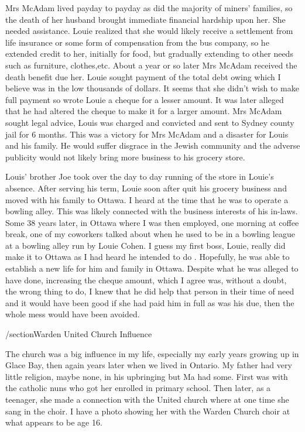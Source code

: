 Mrs McAdam lived payday to payday as did the majority of miners' families, so the death of her husband brought immediate financial hardship upon her. She needed assistance. Louie realized that she would likely receive a settlement from life insurance or some form of compensation from the bus company, so he extended credit to her, initially for food, but gradually extending to other needs such as furniture, clothes,etc. About a year or so later Mrs McAdam received the death benefit due her. Louie sought payment of the total debt owing which I believe was in the low thousands of dollars. It seems that she didn't wish to make full payment so wrote Louie a cheque for a lesser amount. It was later alleged that he had altered the cheque to make it for a larger amount. Mrs McAdam sought legal advice, Louis was charged and convicted and sent to Sydney county jail for 6 months. This was a victory for Mrs McAdam and a disaster for Louis and his family. He would suffer disgrace in the Jewish community and the adverse publicity would not likely bring more business to his grocery store.

Louis' brother Joe took over the day to day running of the store in Louie's absence. After serving his term, Louie soon after quit his grocery business and moved with his family to Ottawa. I heard at the time that he was to operate a bowling alley. This was likely connected with the business interests of his in-laws. Some 38 years later, in Ottawa where I was then employed, one morning at coffee break, one of my coworkers talked about when he used to be in a bowling league at a bowling alley run by Louie Cohen. I guess my first boss, Louie, really did make it to Ottawa as I had heard he intended to do . Hopefully, he was able to establish a new life for him and family in Ottawa. Despite what he was alleged to have done, increasing the cheque amount, which I agree was, without a doubt, the wrong thing to do, I knew that he did help that person in their time of need and it would have been good if she had paid him in full as was his due, then the whole mess would have been avoided.

/section{Warden United Church Influence}

The church was a big influence in my life, especially my early years growing up in Glace Bay, then again years later when we lived in Ontario. My father had very little religion, maybe none, in his upbringing but Ma had some. First was with the catholic nuns who got her enrolled in primary school. Then later, as a teenager, she made a connection with the United church where at one time she sang in the choir. I have a photo showing her with the Warden Church choir at what appears to be age 16.

